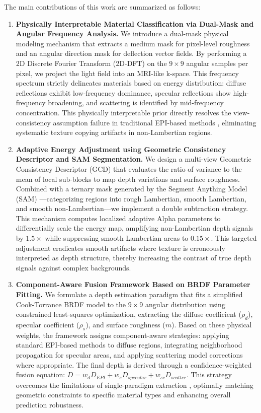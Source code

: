\documentclass[lettersize,journal]{IEEEtran}
\begin{document}
The main contributions of this work are summarized as follows:

\begin{enumerate}
    \item \textbf{Physically Interpretable Material Classification via Dual-Mask and Angular Frequency Analysis.} We introduce a dual-mask physical modeling mechanism that extracts a medium mask for pixel-level roughness and an angular direction mask for deflection vector fields. By performing a 2D Discrete Fourier Transform (2D-DFT) on the $9 \times 9$ angular samples per pixel, we project the light field into an MRI-like k-space. This frequency spectrum strictly delineates materials based on energy distribution: diffuse reflections exhibit low-frequency dominance, specular reflections show high-frequency broadening, and scattering is identified by mid-frequency concentration. This physically interpretable prior directly resolves the view-consistency assumption failure in traditional EPI-based methods \cite{wanner2014}, eliminating systematic texture copying artifacts in non-Lambertian regions.
    
    \item \textbf{Adaptive Energy Adjustment using Geometric Consistency Descriptor and SAM Segmentation.} We design a multi-view Geometric Consistency Descriptor (GCD) that evaluates the ratio of variance to the mean of local sub-blocks to map depth variations and surface roughness. Combined with a ternary mask generated by the Segment Anything Model (SAM) \cite{kirillov2023}—categorizing regions into rough Lambertian, smooth Lambertian, and smooth non-Lambertian—we implement a double subtraction strategy. This mechanism computes localized adaptive Alpha parameters to differentially scale the energy map, amplifying non-Lambertian depth signals by $1.5\times$ while suppressing smooth Lambertian areas to $0.15\times$. This targeted adjustment eradicates smooth artifacts where texture is erroneously interpreted as depth structure, thereby increasing the contrast of true depth signals against complex backgrounds.
    
    \item \textbf{Component-Aware Fusion Framework Based on BRDF Parameter Fitting.} We formulate a depth estimation paradigm that fits a simplified Cook-Torrance BRDF model to the $9 \times 9$ angular distribution using constrained least-squares optimization, extracting the diffuse coefficient ($\rho_d$), specular coefficient ($\rho_s$), and surface roughness ($m$). Based on these physical weights, the framework assigns component-aware strategies: applying standard EPI-based methods to diffuse regions, integrating neighborhood propagation for specular areas, and applying scattering model corrections where appropriate. The final depth is derived through a confidence-weighted fusion equation: $D = w_d D_{EPI} + w_s D_{specular} + w_{sc} D_{scatter}$. This strategy overcomes the limitations of single-paradigm extraction \cite{zhang2023}, optimally matching geometric constraints to specific material types and enhancing overall prediction robustness.
\end{enumerate}
\end{document}
